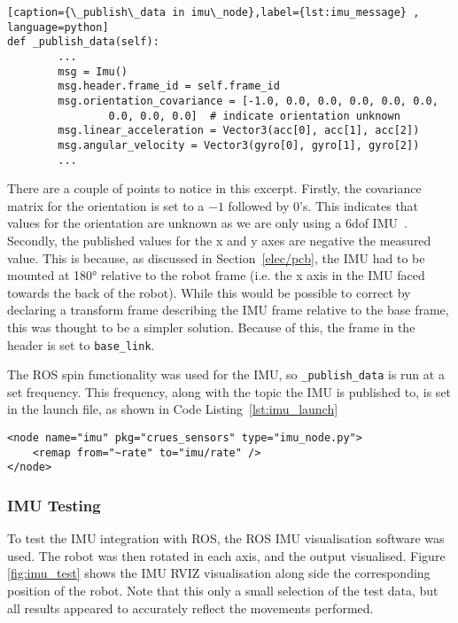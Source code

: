 \begin{lstlisting}[caption={\_publish\_data in imu\_node},label={lst:imu_message} , language=python]
def _publish_data(self):
        ...
        msg = Imu()
        msg.header.frame_id = self.frame_id
        msg.orientation_covariance = [-1.0, 0.0, 0.0, 0.0, 0.0, 0.0,
                0.0, 0.0, 0.0]  # indicate orientation unknown
        msg.linear_acceleration = Vector3(acc[0], acc[1], acc[2])
        msg.angular_velocity = Vector3(gyro[0], gyro[1], gyro[2])
        ...
\end{lstlisting}

There are a couple of points to notice in this excerpt. Firstly, the
covariance matrix for the orientation is set to a $-1$ followed by 0's.
This indicates that values for the orientation are unknown as we are only
using a 6dof IMU~\cite{ROSIMUMsg}. Secondly, the published values for the
x and y axes are negative the measured value. This is because, as
discussed in Section~\ref{elec/pcb}, the IMU had to be mounted at
\ang{180} relative to the robot frame (i.e. the x axis in the IMU faced
towards the back of the robot). While this would be possible to correct by
declaring a transform frame describing the IMU frame relative to the base
frame, this was thought to be a simpler solution. Because of this, the
frame in the header is set to \verb|base_link|.

The ROS spin functionality was used for the IMU, so
\verb|_publish_data| is run at a set
frequency. This frequency, along with the topic the
IMU is published to, is set in the launch file, as
shown in Code Listing~\ref{lst:imu_launch}

\begin{lstlisting}[caption={\texttt{\_publish\_data} in \texttt{imu\_node}}, label={lst:imu_message}, style=xml]
<node name="imu" pkg="crues_sensors" type="imu_node.py">
    <remap from="~rate" to="imu/rate" />
</node>
\end{lstlisting}

\subsubsection{IMU Testing}\label{soft/odometry/imu/test}

To test the IMU integration with ROS, the ROS IMU visualisation software was used.
The robot was then rotated in each axis, and the output visualised.
Figure \ref{fig:imu_test} shows the IMU RVIZ visualisation along side the
corresponding position of the robot. Note that this only a small selection
of the test data, but all results appeared to accurately reflect the
movements performed.

